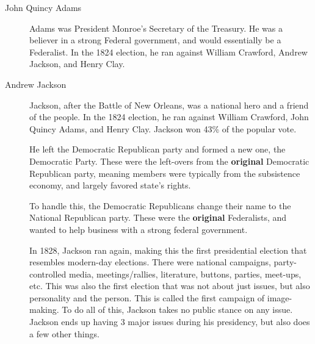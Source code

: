 \begin{description}
\item[John Quincy Adams] Adams was President Monroe's Secretary of the Treasury.
  He was a believer in a strong Federal government, and would essentially be a Federalist.
  In the 1824 election, he ran against William Crawford, Andrew Jackson, and Henry Clay.

\item[Andrew Jackson] Jackson, after the Battle of New Orleans, was a national hero and a friend of the people.
  In the 1824 election, he ran against William Crawford, John Quincy Adams, and Henry Clay.
  Jackson won 43\% of the popular vote.

  He left the Democratic Republican party and formed a new one, the Democratic Party.
  These were the left-overs from the \textbf{original} Democratic Republican party, meaning members were typically from the subsistence economy, and largely favored state's rights.

  To handle this, the Democratic Republicans change their name to the National Republican party.
  These were the \textbf{original} Federalists, and wanted to help business with a strong federal government.

  In 1828, Jackson ran again, making this the first presidential election that resembles modern-day elections.
  There were national campaigns, party-controlled media, meetings/rallies, literature, buttons, parties, meet-ups, etc.\@
  This was also the first election that was not about just issues, but also personality and the person.
  This is called the first campaign of image-making.
  To do all of this, Jackson takes no public stance on any issue.
  Jackson ends up having 3 major issues during his presidency, but also does a few other things.
\end{description}
